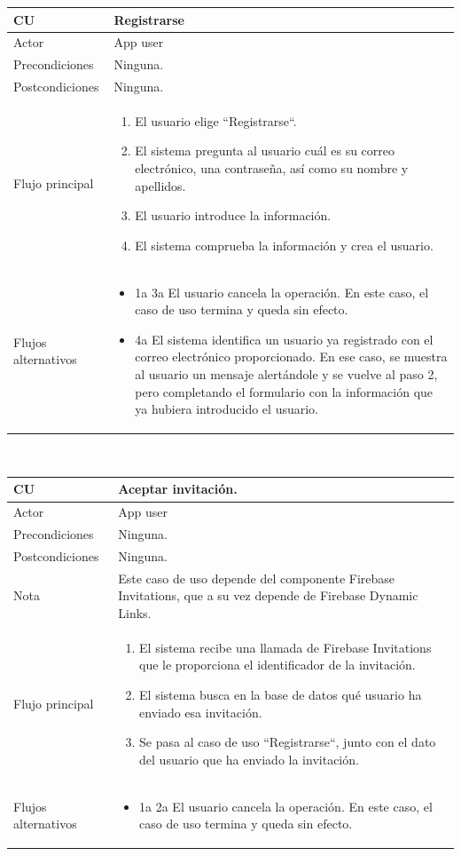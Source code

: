 \documentclass[twoside]{report}
\newcommand\addrow[2]{#1 &#2\\ }
\newcommand\addheading[2]{#1 &#2\\ \hline}
\newcommand\tabularhead{\begin{tabular}{lp{0.7\textwidth}}
\hline
}
\newenvironment{usecase}{\tabularhead}
{\hline\end{tabular}}
\begin{document}
\begin{usecase}
  \addheading{\textbf{CU\arabic{usecase}}}{Registrarse} 
  \addrow{Actor}{App user}
  \addrow{Precondiciones}{Ninguna.}
  \addrow{Postcondiciones}{Ninguna.}
  \addrow{Flujo principal}{
  		\begin{enumerate}
  		\item El usuario elige “Registrarse“. %
  		\item El sistema pregunta al usuario cuál es su correo electrónico, una contraseña, así como su nombre y apellidos. %
  		\item El usuario introduce la información. %
  		\item El sistema comprueba la información y crea el usuario. %
  		\end{enumerate}
  }
  \addrow{Flujos alternativos}{
  		\begin{itemize}
  		\item 1a 3a El usuario cancela la operación. En este caso, el caso de uso termina y queda sin efecto.
  		\item 4a El sistema identifica un usuario ya registrado con el correo electrónico proporcionado. En ese caso, se muestra al usuario un mensaje alertándole y se vuelve al paso 2, pero completando el formulario con la información que ya hubiera introducido el usuario.
  		\end{itemize}
  }
\end{usecase}\\

\begin{usecase}
  \addheading{\textbf{CU\arabic{usecase}}}{Aceptar invitación.} 
  \addrow{Actor}{App user}
  \addrow{Precondiciones}{Ninguna.}
  \addrow{Postcondiciones}{Ninguna.}
  \addrow{Nota}{Este caso de uso depende del componente Firebase Invitations, que a su vez depende de Firebase Dynamic Links.}
  \addrow{Flujo principal}{
  		\begin{enumerate}
  		\item El sistema recibe una llamada de Firebase Invitations que le proporciona el identificador de la invitación.
  		\item El sistema busca en la base de datos qué usuario ha enviado esa invitación.
  		\item Se pasa al caso de uso “Registrarse“, junto con el dato del usuario que ha enviado la invitación.
  		\end{enumerate}
  }
  \addrow{Flujos alternativos}{
  		\begin{itemize}
  		\item 1a 2a El usuario cancela la operación. En este caso, el caso de uso termina y queda sin efecto.
  		\end{itemize}
  }
\end{usecase}\\
\end{document}
